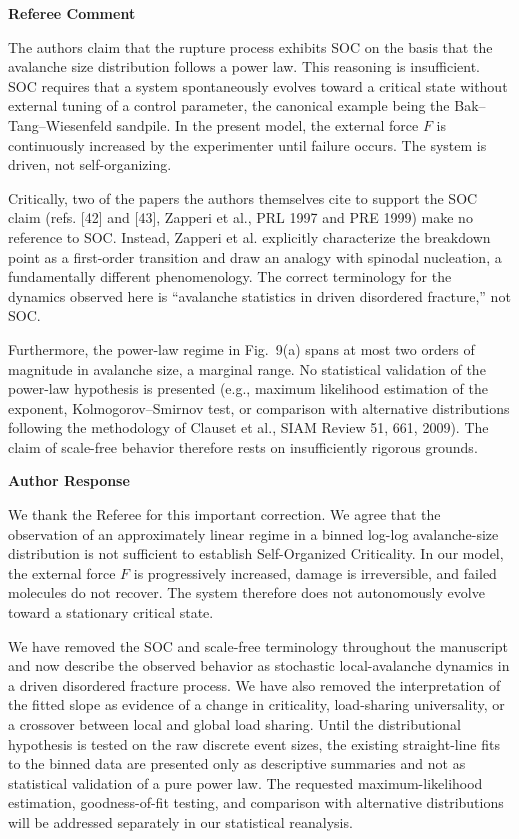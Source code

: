 \documentclass[11pt]{article}
\newenvironment{refereecomment}
  {%
    \par
    \begingroup
    \color{commentgray}
    \itshape
    \setlength{\leftskip}{1.4em}
    \setlength{\rightskip}{1.4em}
  }
  {%
    \par
    \endgroup
  }
\newcommand{\refereelabel}{%
  \par\smallskip
  {\color{commentgray}\bfseries Referee Comment}\par
}
\newcommand{\responselabel}{%
  \par\medskip
  {\color{responseblue}\bfseries Author Response}\par
}
\begin{document}
\refereelabel
\begin{refereecomment}
The authors claim that the rupture process exhibits SOC on the basis that the
avalanche size distribution follows a power law. This reasoning is
insufficient. SOC requires that a system spontaneously evolves toward a
critical state without external tuning of a control parameter, the canonical
example being the Bak--Tang--Wiesenfeld sandpile. In the present model, the
external force \(F\) is continuously increased by the experimenter until
failure occurs. The system is driven, not self-organizing.

Critically, two of the papers the authors themselves cite to support the SOC
claim (refs. [42] and [43], Zapperi et al., PRL 1997 and PRE 1999) make no
reference to SOC. Instead, Zapperi et al. explicitly characterize the breakdown
point as a first-order transition and draw an analogy with spinodal nucleation,
a fundamentally different phenomenology. The correct terminology for the
dynamics observed here is ``avalanche statistics in driven disordered
fracture,'' not SOC.

Furthermore, the power-law regime in Fig.~9(a) spans at most two orders of
magnitude in avalanche size, a marginal range. No statistical validation of
the power-law hypothesis is presented (e.g., maximum likelihood estimation of
the exponent, Kolmogorov--Smirnov test, or comparison with alternative
distributions following the methodology of Clauset et al., SIAM Review 51,
661, 2009). The claim of scale-free behavior therefore rests on insufficiently
rigorous grounds.
\end{refereecomment}

\responselabel
We thank the Referee for this important correction. We agree that the
observation of an approximately linear regime in a binned log-log
avalanche-size distribution is not sufficient to establish Self-Organized
Criticality. In our model, the external force \(F\) is progressively increased,
damage is irreversible, and failed molecules do not recover. The system
therefore does not autonomously evolve toward a stationary critical state.

We have removed the SOC and scale-free terminology throughout the manuscript
and now describe the observed behavior as stochastic local-avalanche dynamics
in a driven disordered fracture process. We have also removed the interpretation
of the fitted slope as evidence of a change in criticality, load-sharing
universality, or a crossover between local and global load sharing. Until the
distributional hypothesis is tested on the raw discrete event sizes, the
existing straight-line fits to the binned data are presented only as
descriptive summaries and not as statistical validation of a pure power law.
The requested maximum-likelihood estimation, goodness-of-fit testing, and
comparison with alternative distributions will be addressed separately in our
statistical reanalysis.
\end{document}
